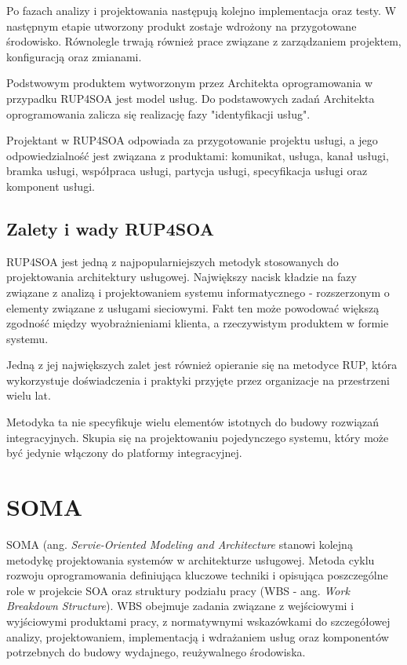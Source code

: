 Po fazach analizy i projektowania następują kolejno implementacja oraz testy. W następnym etapie utworzony produkt zostaje wdrożony na przygotowane środowisko. Równolegle trwają również prace związane z zarządzaniem projektem, konfiguracją oraz zmianami. \cite{PlatIntGor}

Podstwowym produktem wytworzonym przez Architekta oprogramowania w przypadku RUP4SOA jest model usług. Do podstawowych zadań Architekta oprogramowania zalicza się realizację fazy "identyfikacji usług".

Projektant w RUP4SOA odpowiada za przygotowanie projektu usługi, a jego odpowiedzialność jest związana z produktami: komunikat, usługa, kanał usługi, bramka usługi, współpraca usługi, partycja usługi, specyfikacja usługi oraz komponent usługi. 

\subsection{Zalety i wady RUP4SOA}
RUP4SOA jest jedną z najpopularniejszych metodyk stosowanych do projektowania architektury usługowej. Największy nacisk kładzie na fazy związane z analizą i projektowaniem systemu informatycznego - rozszerzonym o elementy związane z usługami sieciowymi. Fakt ten może powodować większą zgodność między wyobrażnieniami klienta, a rzeczywistym produktem w formie systemu. 

Jedną z jej największych zalet jest również opieranie się na metodyce RUP, która wykorzystuje doświadczenia i praktyki przyjęte przez organizacje na przestrzeni wielu lat. \cite{JonSimRUPSoa}

Metodyka ta nie specyfikuje wielu elementów istotnych do budowy rozwiązań integracyjnych. Skupia się na projektowaniu pojedynczego systemu, który może być jedynie włączony do platformy integracyjnej. \cite{PlatIntGor}

\section{SOMA}
SOMA (ang. \textit{Servie-Oriented Modeling and Architecture} stanowi kolejną metodykę projektowania systemów w architekturze usługowej. \cite{PlatIntGor} Metoda cyklu rozwoju oprogramowania definiująca kluczowe techniki i opisująca poszczególne role w projekcie SOA oraz struktury podziału pracy (WBS - ang. \textit{Work Breakdown Structure}). WBS obejmuje zadania związane z wejściowymi i wyjściowymi produktami pracy, z normatywnymi wskazówkami do szczegółowej analizy, projektowaniem, implementacją i wdrażaniem usług oraz komponentów potrzebnych do budowy wydajnego, reużywalnego środowiska. \cite{SOMAArsIBMJour}

